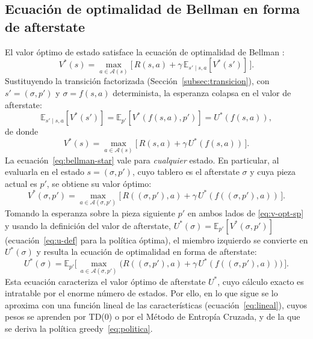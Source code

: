 \subsection{Ecuación de optimalidad de Bellman en forma de afterstate}
El valor óptimo de estado satisface la ecuación de optimalidad de Bellman
\citep{bellman1957, sutton2018}:
\begin{equation}
    V^{*}(s) = \max_{a \in \mathcal{A}(s)}
    \big[\, R(s,a) + \gamma\, \mathbb{E}_{s' \mid s,a}\!\left[ V^{*}(s') \right] \,\big].
    \label{eq:bellman-estado}
\end{equation}
Sustituyendo la transición factorizada (Sección~\ref{subsec:transicion}), con
$s' = (\sigma, p')$ y $\sigma = f(s,a)$ determinista, la esperanza colapsa en el
valor de afterstate:
\begin{equation}
    \mathbb{E}_{s' \mid s,a}\!\left[ V^{*}(s') \right]
    = \mathbb{E}_{p'}\!\left[ V^{*}(f(s,a), p') \right]
    = U^{*}(f(s,a)),
    \label{eq:colapso}
\end{equation}
de donde
\begin{equation}
    V^{*}(s) = \max_{a \in \mathcal{A}(s)}
    \big[\, R(s,a) + \gamma\, U^{*}(f(s,a)) \,\big].
    \label{eq:bellman-star}
\end{equation}
La ecuación~\eqref{eq:bellman-star} vale para \emph{cualquier} estado. En
particular, al evaluarla en el estado $s = (\sigma, p')$, cuyo tablero es el
afterstate $\sigma$ y cuya pieza actual es $p'$, se obtiene su valor óptimo:
\begin{equation}
    V^{*}(\sigma, p') = \max_{a \in \mathcal{A}(\sigma, p')}
    \big[\, R((\sigma, p'), a) + \gamma\, U^{*}(f((\sigma, p'), a)) \,\big].
    \label{eq:v-opt-sp}
\end{equation}
Tomando la esperanza sobre la pieza siguiente $p'$ en ambos lados de
\eqref{eq:v-opt-sp} y usando la definición del valor de afterstate,
$U^{*}(\sigma) = \mathbb{E}_{p'}\!\left[ V^{*}(\sigma, p') \right]$
(ecuación~\eqref{eq:u-def} para la política óptima), el miembro izquierdo se
convierte en $U^{*}(\sigma)$ y resulta la ecuación de optimalidad en forma de
afterstate:
\begin{equation}
    U^{*}(\sigma) = \mathbb{E}_{p'}\!\Big[\,
        \max_{a \in \mathcal{A}(\sigma, p')}
        \big( R((\sigma, p'), a) + \gamma\, U^{*}(f((\sigma, p'), a)) \big)
        \,\Big].
    \label{eq:bellman-afterstate}
\end{equation}
Esta ecuación caracteriza el valor óptimo de afterstate $U^{*}$, cuyo cálculo
exacto es intratable por el enorme número de estados. Por ello, en lo que sigue se
lo aproxima con una función lineal de las características (ecuación~\eqref{eq:lineal}),
cuyos pesos se aprenden por TD(0) o por el Método de Entropía Cruzada, y de la que
se deriva la política greedy~\eqref{eq:politica}.

